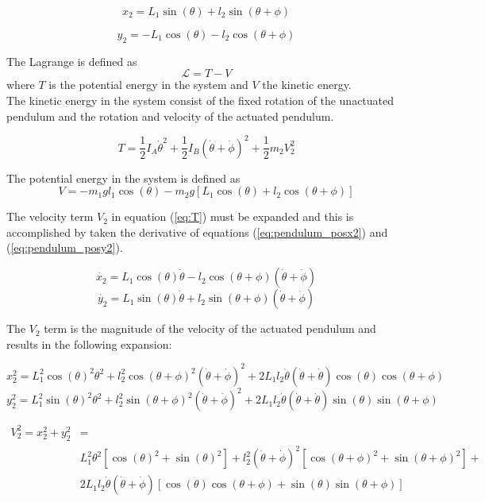 \begin{equation}
\label{eq:pendulum_posx2}
x_{2} = L_{1}\sin(\theta) + l_{2}\sin(\theta + \phi)
\end{equation}

\begin{equation}
\label{eq:pendulum_posy2}
y_{2} = -L_{1}\cos(\theta) - l_{2}\cos(\theta + \phi)
\end{equation}

The Lagrange is defined as 
$$\mathcal{L}=T-V$$
where $T$ is the potential energy in the system and $V$ the kinetic energy.\\

The kinetic energy in the system consist of the fixed rotation of the unactuated  pendulum and the rotation and velocity of the actuated pendulum.

\begin{equation}
\label{eq:T}
T = \frac{1}{2}I_{A}\dot{\theta}^2 + \frac{1}{2}I_{B}(\dot{\theta}+\dot{\phi})^2 + \frac{1}{2}m_{2}V_{2}^2
\end{equation}

The potential energy in the system is defined as
$$V=-m_{1}gl_{1}\cos(\theta)-m_{2}g[L_{1}\cos(\theta)+l_{2}\cos(\theta+\phi)]$$

The velocity term $V_{2}$ in equation (\ref{eq:T}) must be expanded and this is accomplished by taken the derivative of equations (\ref{eq:pendulum_posx2}) and (\ref{eq:pendulum_posy2}).

$$\dot{x_{2}} = L_{1}\cos(\theta)\dot{\theta} - l_{2}\cos(\theta+\phi)(\dot{\theta}+\dot{\phi}) $$
$$\dot{y_{2}} = L_{1}\sin(\theta)\dot{\theta}+l_{2}\sin(\theta+\phi)(\dot{\theta}+\dot{\phi})$$

The $V_{2}$ term is the magnitude of the velocity of the actuated pendulum and results in the following expansion:

$$x_{2}^2 = L_{1}^2\cos(\theta)^2\theta^2 +l_{2}^2\cos(\theta+\phi)^2(\dot{\theta}+\dot{\phi})^2 + 2L_{1}l_{2}\dot{\theta}(\dot{\theta}+\dot{\theta})\cos(\theta)\cos(\theta+\phi)$$
$$y_{2}^2 = L_{1}^2\sin(\theta)^2\theta^2 +l_{2}^2\sin(\theta+\phi)^2(\dot{\theta}+\dot{\phi})^2 + 2L_{1}l_{2}\dot{\theta}(\dot{\theta}+\dot{\theta})\sin(\theta)\sin(\theta+\phi)$$

\begin{equation}
\label{eq:V_squared}
\begin{split}
V_{2}^2 = x_{2}^2+y_{2}^2 & = \\ &L_{1}^2\theta^2[\cos(\theta)^2+\sin(\theta)^2]+l_{2}^2(\dot{\theta}+\dot{\phi})^2[\cos(\theta+\phi)^2+\sin(\theta+\phi)^2] + \\
&2L_{1}l_{2}\dot{\theta}(\dot{\theta}+\dot{\phi})[\cos(\theta)\cos(\theta+\phi)+\sin(\theta)\sin(\theta+\phi)]
\end{split}
\end{equation}


